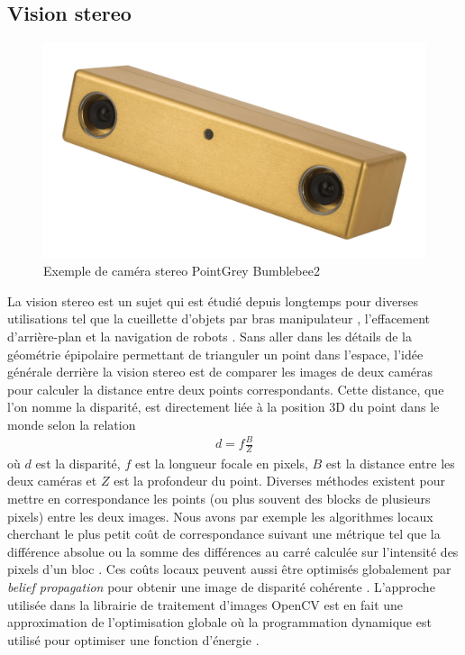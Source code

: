 \subsection{Vision stereo}\label{subsec:stereo_vision}

\begin{figure}[h]
  \centering
  \includegraphics[width=0.5\linewidth]{images/bumblebee2.jpg}
  \caption[Exemple de caméra stereo]{Exemple de caméra stereo PointGrey Bumblebee2}
  \label{fig:stereo_camera}
\end{figure}

La vision stereo est un sujet qui est étudié depuis longtemps pour diverses utilisations tel que la cueillette d'objets par bras manipulateur \citep{Hernandez2017}, l'effacement d'arrière-plan \citep{Kanade1996Stereo} et la navigation de robots \citep{Fraundorfer2012}. Sans aller dans les détails de la géométrie épipolaire permettant de trianguler un point dans l'espace, l'idée générale derrière la vision stereo est de comparer les images de deux caméras pour calculer la distance entre deux points correspondants. Cette distance, que l'on nomme la disparité, est directement liée à la position 3D du point dans le monde selon la relation
\begin{align}
  d = f \frac{B}{Z}
\end{align}
où $d$ est la disparité, $f$ est la longueur focale en pixels, $B$ est la distance entre les deux caméras et $Z$ est la profondeur du point. Diverses méthodes existent pour mettre en correspondance les points (ou plus souvent des blocks de plusieurs pixels) entre les deux images. Nous avons par exemple les algorithmes locaux cherchant le plus petit coût de correspondance suivant une métrique tel que la différence absolue ou la somme des différences au carré calculée sur l'intensité des pixels d'un bloc \citep{Szeliski2011}. Ces coûts locaux peuvent aussi être optimisés globalement par \textit{belief propagation} pour obtenir une image de disparité cohérente \citep{Klaus2006}. L'approche utilisée dans la librairie de traitement d'images OpenCV est en fait une approximation de l'optimisation globale où la programmation dynamique est utilisé pour optimiser une fonction d'énergie \citep{Hirschmuller2008}.

